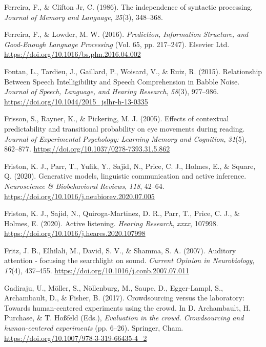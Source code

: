 \documentclass[a4paper, nobind]{templates/ociamthesis}
\newlength{\cslhangindent}
\newenvironment{CSLReferences}[2] %
 {%
  \setlength{\parindent}{0pt}
  \ifodd #1
  \let\oldpar\par
  \def\par{\hangindent=\cslhangindent\oldpar}
  \fi
  \setlength{\parskip}{1mm}
  \setlength{\baselineskip}{6mm}
 }%
 {}
\begin{document}
\begin{CSLReferences}{1}{0}
\leavevmode{}%
Ferreira, F., \& Clifton Jr, C. (1986). The independence of syntactic processing. \emph{Journal of Memory and Language}, \emph{25}(3), 348--368.

\leavevmode{}%
Ferreira, F., \& Lowder, M. W. (2016). \emph{{Prediction, Information Structure, and Good-Enough Language Processing}} (Vol. 65, pp. 217--247). Elsevier Ltd. \url{https://doi.org/10.1016/bs.plm.2016.04.002}

\leavevmode{}%
Fontan, L., Tardieu, J., Gaillard, P., Woisard, V., \& Ruiz, R. (2015). Relationship Between Speech Intelligibility and Speech Comprehension in Babble Noise. \emph{Journal of Speech, Language, and Hearing Research}, \emph{58}(3), 977--986. \url{https://doi.org/10.1044/2015_jslhr-h-13-0335}

\leavevmode{}%
Frisson, S., Rayner, K., \& Pickering, M. J. (2005). {Effects of contextual predictability and transitional probability on eye movements during reading}. \emph{Journal of Experimental Psychology: Learning Memory and Cognition}, \emph{31}(5), 862--877. \url{https://doi.org/10.1037/0278-7393.31.5.862}

\leavevmode{}%
Friston, K. J., Parr, T., Yufik, Y., Sajid, N., Price, C. J., Holmes, E., \& Square, Q. (2020). {Generative models, linguistic communication and active inference}. \emph{Neuroscience {\&} Biobehavioral Reviews}, \emph{118}, 42--64. \url{https://doi.org/10.1016/j.neubiorev.2020.07.005}

\leavevmode{}%
Friston, K. J., Sajid, N., Quiroga-Martinez, D. R., Parr, T., Price, C. J., \& Holmes, E. (2020). {Active listening}. \emph{Hearing Research}, \emph{xxxx}, 107998. \url{https://doi.org/10.1016/j.heares.2020.107998}

\leavevmode{}%
Fritz, J. B., Elhilali, M., David, S. V., \& Shamma, S. A. (2007). {Auditory attention - focusing the searchlight on sound}. \emph{Current Opinion in Neurobiology}, \emph{17}(4), 437--455. \url{https://doi.org/10.1016/j.conb.2007.07.011}

\leavevmode{}%
Gadiraju, U., Möller, S., Nöllenburg, M., Saupe, D., Egger-Lampl, S., Archambault, D., \& Fisher, B. (2017). {Crowdsourcing versus the laboratory: Towards human-centered experiments using the crowd}. In D. Archambault, H. Purchase, \& T. Hoßfeld (Eds.), \emph{Evaluation in the crowd. Crowdsourcing and human-centered experiments} (pp. 6--26). Springer, Cham. \url{https://doi.org/10.1007/978-3-319-66435-4_2}


\end{CSLReferences}
\end{document}
